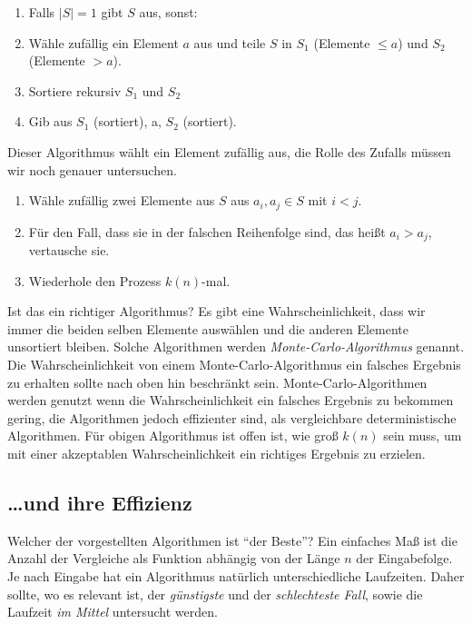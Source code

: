 \begin{Alg}[Quicksort]\label{Quicksort}
\begin{enumerate}
\item Falls $|S| = 1$ gibt $S$ aus, sonst:
\item Wähle zufällig ein Element $a$ aus und teile $S$ in $S_1$ (Elemente $\le a$) und $S_2$ (Elemente $>a$).
\item Sortiere rekursiv $S_1$ und $S_2$
\item Gib aus $S_1$ (sortiert), a, $S_2$ (sortiert).
\end{enumerate}
\end{Alg}

Dieser Algorithmus wählt ein Element zufällig aus, die Rolle des Zufalls müssen wir noch genauer untersuchen.

\begin{Alg}\label{Alter-Mann}
\begin{enumerate}
\item Wähle zufällig zwei Elemente aus $S$ aus $a_i, a_j \in S$ mit $i < j$.
\item Für den Fall, dass sie in der falschen Reihenfolge sind, das heißt $a_i > a_j$, vertausche sie.
\item Wiederhole den Prozess $k(n)$-mal.
\end{enumerate}
\end{Alg}

\begin{Bem}\label{Monte-Carlo}
\hspace{\parindent}Ist das ein richtiger Algorithmus? Es gibt eine Wahrscheinlichkeit, dass wir immer die beiden selben Elemente auswählen und die anderen Elemente unsortiert bleiben. Solche Algorithmen werden\textit{ Monte-Carlo-Algorithmus} genannt. Die Wahrscheinlichkeit von einem Monte-Carlo-Algorithmus ein falsches Ergebnis zu erhalten sollte nach oben hin beschränkt sein. Monte-Carlo-Algorithmen werden genutzt wenn die Wahrscheinlichkeit ein falsches Ergebnis zu bekommen gering, die Algorithmen jedoch effizienter sind, als vergleichbare deterministische Algorithmen. Für obigen Algorithmus ist offen ist, wie groß $k(n)$ sein muss, um mit einer akzeptablen Wahrscheinlichkeit ein richtiges Ergebnis zu erzielen.
\end{Bem}

\subsection{\dots und ihre Effizienz}
Welcher der vorgestellten Algorithmen ist "`der Beste"'? Ein einfaches Maß ist die Anzahl der Vergleiche als Funktion abhängig von der Länge $n$ der Eingabefolge. Je nach Eingabe hat ein Algorithmus natürlich unterschiedliche Laufzeiten. Daher sollte, wo es relevant ist, der \textit{günstigste} und der \textit{schlechteste Fall}, sowie die Laufzeit \textit{im Mittel} untersucht werden.

